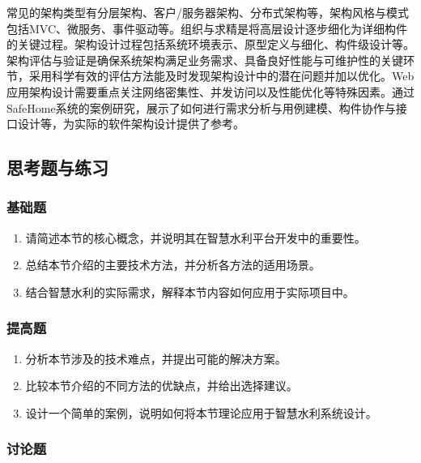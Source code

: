 常见的架构类型有分层架构、客户/服务器架构、分布式架构等，架构风格与模式包括MVC、微服务、事件驱动等。组织与求精是将高层设计逐步细化为详细构件的关键过程。架构设计过程包括系统环境表示、原型定义与细化、构件级设计等。架构评估与验证是确保系统架构满足业务需求、具备良好性能与可维护性的关键环节，采用科学有效的评估方法能及时发现架构设计中的潜在问题并加以优化。Web应用架构设计需要重点关注网络密集性、并发访问以及性能优化等特殊因素。通过SafeHome系统的案例研究，展示了如何进行需求分析与用例建模、构件协作与接口设计等，为实际的软件架构设计提供了参考。

\subsection{思考题与练习}\label{ux601dux8003ux9898ux4e0eux7ec3ux4e60-3}

\subsubsection{基础题}\label{ux57faux7840ux9898-3}

\begin{enumerate}
\def\labelenumi{\arabic{enumi}.}
\tightlist
\item
  请简述本节的核心概念，并说明其在智慧水利平台开发中的重要性。
\item
  总结本节介绍的主要技术方法，并分析各方法的适用场景。
\item
  结合智慧水利的实际需求，解释本节内容如何应用于实际项目中。
\end{enumerate}

\subsubsection{提高题}\label{ux63d0ux9ad8ux9898-3}

\begin{enumerate}
\def\labelenumi{\arabic{enumi}.}
\setcounter{enumi}{3}
\tightlist
\item
  分析本节涉及的技术难点，并提出可能的解决方案。
\item
  比较本节介绍的不同方法的优缺点，并给出选择建议。
\item
  设计一个简单的案例，说明如何将本节理论应用于智慧水利系统设计。
\end{enumerate}

\subsubsection{讨论题}\label{ux8ba8ux8bbaux9898-3}

